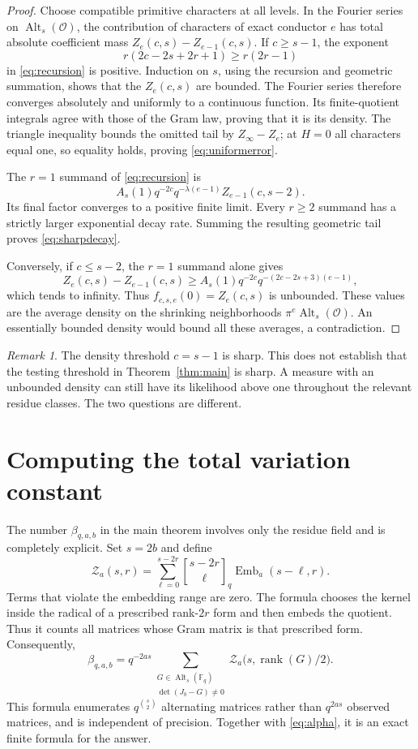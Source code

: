 \documentclass[11pt]{article}
\theoremstyle{remark}
\newtheorem{remark}[theorem]{Remark}
\newcommand{\OO}{\mathcal O}
\newcommand{\FF}{\mathbb F}
\newcommand{\Alt}{\operatorname{Alt}}
\newcommand{\rank}{\operatorname{rank}}
\newcommand{\Emb}{\operatorname{Emb}}
\newcommand{\qbin}[2]{\genfrac{[}{]}{0pt}{}{#1}{#2}_q}
\begin{document}
\begin{proof}
Choose compatible primitive characters at all levels. In the Fourier
series on \(\Alt_s(\OO)\), the contribution of characters of exact
conductor \(e\) has total absolute coefficient mass
\(Z_e(c,s)-Z_{e-1}(c,s)\).
If \(c\ge s-1\), the exponent
\[
 r(2c-2s+2r+1)\ge r(2r-1)
\]
in \eqref{eq:recursion} is positive.
Induction on \(s\), using the recursion and geometric summation, shows
that the \(Z_e(c,s)\) are bounded. The Fourier series therefore converges
absolutely and uniformly to a continuous function. Its finite-quotient
integrals agree with those of the Gram law, proving that it is its density.
The triangle inequality bounds the omitted tail by
\(Z_\infty-Z_e\); at \(H=0\) all characters equal one, so equality
holds, proving \eqref{eq:uniformerror}.

The \(r=1\) summand of \eqref{eq:recursion} is
\[
 A_s(1)q^{-2c}q^{-\lambda(e-1)}Z_{e-1}(c,s-2).
\]
Its final factor converges to a positive finite limit. Every \(r\ge2\)
summand has a strictly larger exponential decay rate. Summing the resulting
geometric tail proves \eqref{eq:sharpdecay}.

Conversely, if \(c\le s-2\), the \(r=1\) summand alone gives
\[
 Z_e(c,s)-Z_{e-1}(c,s)
 \ge A_s(1)q^{-2c}q^{-(2c-2s+3)(e-1)},
\]
which tends to infinity. Thus \(f_{c,s,e}(0)=Z_e(c,s)\) is unbounded.
These values are the average density on the shrinking neighborhoods
\(\pi^e\Alt_s(\OO)\). An essentially bounded density would bound all
these averages, a contradiction.
\end{proof}

\begin{remark}
The density threshold \(c=s-1\) is sharp.
This does not establish that the testing threshold in
Theorem~\ref{thm:main} is sharp. A measure with an unbounded density can
still have its likelihood above one throughout the relevant residue
classes. The two questions are different.
\end{remark}

\section{Computing the total variation constant}

The number \(\beta_{q,a,b}\) in the main theorem involves only the
residue field and is completely explicit.
Set \(s=2b\) and define
\[
 \mathcal Z_a(s,r)=
 \sum_{\ell=0}^{s-2r}
 \qbin{s-2r}{\ell}\Emb_a(s-\ell,r).
 \tag{6.1}\label{eq:Zcount}
\]
Terms that violate the embedding range are zero. The formula chooses
the kernel inside the radical of a prescribed rank-\(2r\) form and
then embeds the quotient. Thus it counts all matrices whose Gram
matrix is that prescribed form. Consequently,
\[
 \boxed{\quad
 \beta_{q,a,b}
 =q^{-2as}
 \sum_{\substack{G\in\Alt_s(\FF_q)\\\det(J_b-G)\ne0}}
      \mathcal Z_a\bigl(s,\rank(G)/2\bigr).\quad}
 \tag{6.2}\label{eq:betaexact}
\]
This formula enumerates \(q^{\binom s2}\) alternating matrices rather
than \(q^{2as}\) observed matrices, and is independent of precision.
Together with \eqref{eq:alpha}, it is an exact finite formula for the
answer.
\end{document}
